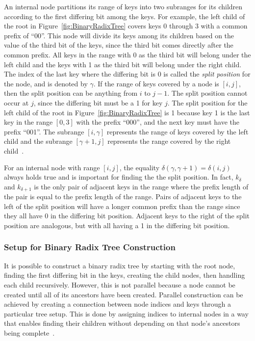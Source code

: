 \documentclass{sig-alternate}
\begin{document}
An internal node partitions its range of keys into two subranges for its children according to the first differing bit among the keys. For example, the left child of the root in Figure~\ref{fig:BinaryRadixTree} covers keys 0 through 3 with a common prefix of ``00''. This node will divide its keys among its children based on the value of the third bit of the keys, since the third bit comes directly after the common prefix. All keys in the range with 0 as the third bit will belong under the left child and the keys with 1 as the third bit will belong under the right child. The index of the last key where the differing bit is 0 is called the \emph{split position} for the node, and is denoted by $\gamma$. If the range of keys covered by a node is $[i,j]$, then the split position can be anything from $i$ to $j-1$. The split position cannot occur at $j$, since the differing bit must be a 1 for key $j$. The split position for the left child of the root in Figure~\ref{fig:BinaryRadixTree} is 1 because key 1 is the last key in the range $[0,3]$ with the prefix ``000'', and the next key must have the prefix ``001''. The subrange $[i,\gamma]$ represents the range of keys covered by the left child and the subrange $[\gamma+1,j]$ represents the range covered by the right child~\cite{Karras:2012}.

For an internal node with range $[i,j]$, the equality $\delta(\gamma,\gamma+1)=\delta(i,j)$ always holds true and is important for finding the the split position. In fact, $k_{\delta}$ and $k_{\delta+1}$ is the only pair of adjacent keys in the range where the prefix length of the pair is equal to the prefix length of the range. Pairs of adjacent keys to the left of the split position will have a longer common prefix than the range since they all have 0 in the differing bit position. Adjacent keys to the right of the split position are analogous, but with all having a 1 in the differing bit position.

\subsubsection{Setup for Binary Radix Tree Construction}
\label{sec:setup}

It is possible to construct a binary radix tree by starting with the root node, finding the first differing bit in the keys, creating the child nodes, then handling each child recursively. However, this is not parallel because a node cannot be created until all of its ancestors have been created. Parallel construction can be achieved by creating a connection between node indices and keys through a particular tree setup. This is done by assigning indices to internal nodes in a way that enables finding their children without depending on that node's ancestors being complete~\cite{Karras:2012}.
\end{document}
